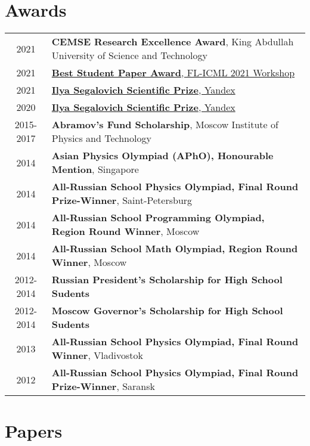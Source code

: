 \documentclass[a4paper,10pt]{article} %
\begin{document}
\section{Awards}
\hypersetup{colorlinks,breaklinks,urlcolor=black,linkcolor=black}
\begin{tabular}{cl}
	\textsc{2021} & \textbf{CEMSE Research Excellence Award}, King Abdullah University of Science and Technology\\
	\textsc{2021} & \href{http://federated-learning.org/fl-icml-2021/}{\textbf{Best Student Paper Award}, FL-ICML 2021 Workshop}\\
	\textsc{2021} & \href{https://yandex.ru/scholarships/scholars}{\textbf{Ilya Segalovich Scientific Prize}, Yandex} \\
	\textsc{2020} & \href{https://yandex.ru/scholarships/scholars}{\textbf{Ilya Segalovich Scientific Prize}, Yandex}\\
	\textsc{2015-2017} & \textbf{Abramov’s Fund Scholarship}, Moscow Institute of Physics and Technology\\
	\textsc{2014} & \textbf{Asian Physics Olympiad (APhO), Honourable Mention}, Singapore\\
	\textsc{2014} & \textbf{All-Russian School Physics Olympiad, Final Round Prize-Winner}, Saint-Petersburg\\
	\textsc{2014} & \textbf{All-Russian School Programming Olympiad, Region Round Winner}, Moscow\\
	\textsc{2014} & \textbf{All-Russian School Math Olympiad, Region Round Winner}, Moscow\\
	\textsc{2012-2014} & \textbf{Russian President’s Scholarship for High School Sudents}\\
	\textsc{2012-2014} & \textbf{Moscow Governor’s Scholarship for High School Sudents}\\
	\textsc{2013} & \textbf{All-Russian School Physics Olympiad, Final Round Winner}, Vladivostok\\
	\textsc{2012} & \textbf{All-Russian School Physics Olympiad, Final Round Prize-Winner}, Saransk\\
\end{tabular}
\hypersetup{colorlinks,breaklinks,urlcolor=linkcolour,linkcolor=linkcolour}

\newpage

\section{Papers}


\end{document}

